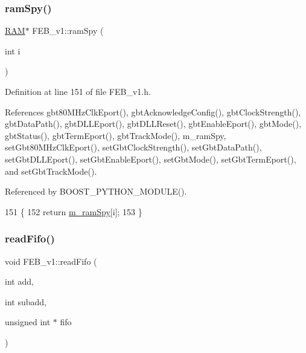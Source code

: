 \subsubsection{\texorpdfstring{ram\+Spy()}{ramSpy()}}
{\footnotesize\ttfamily \hyperlink{classRAM}{R\+AM}$\ast$ F\+E\+B\+\_\+v1\+::ram\+Spy (\begin{DoxyParamCaption}\item[{int}]{i }\end{DoxyParamCaption})\hspace{0.3cm}{\ttfamily [inline]}}



Definition at line 151 of file F\+E\+B\+\_\+v1.\+h.



References gbt80\+M\+Hz\+Clk\+Eport(), gbt\+Acknowledge\+Config(), gbt\+Clock\+Strength(), gbt\+Data\+Path(), gbt\+D\+L\+L\+Eport(), gbt\+D\+L\+L\+Reset(), gbt\+Enable\+Eport(), gbt\+Mode(), gbt\+Status(), gbt\+Term\+Eport(), gbt\+Track\+Mode(), m\+\_\+ram\+Spy, set\+Gbt80\+M\+Hz\+Clk\+Eport(), set\+Gbt\+Clock\+Strength(), set\+Gbt\+Data\+Path(), set\+Gbt\+D\+L\+L\+Eport(), set\+Gbt\+Enable\+Eport(), set\+Gbt\+Mode(), set\+Gbt\+Term\+Eport(), and set\+Gbt\+Track\+Mode().



Referenced by B\+O\+O\+S\+T\+\_\+\+P\+Y\+T\+H\+O\+N\+\_\+\+M\+O\+D\+U\+L\+E().


\begin{DoxyCode}
151                      \{
152     \textcolor{keywordflow}{return} \hyperlink{classFEB__v1_ae6d8176c12bd60ad25ed81d535eb8c82}{m\_ramSpy}[i];
153   \}
\end{DoxyCode}
\mbox{\label{classFEB__v1_af945f99a912c5ad076ebdb03dbb6c139}} 
\subsubsection{\texorpdfstring{read\+Fifo()}{readFifo()}}
{\footnotesize\ttfamily void F\+E\+B\+\_\+v1\+::read\+Fifo (\begin{DoxyParamCaption}\item[{int}]{add,  }\item[{int}]{subadd,  }\item[{unsigned int $\ast$}]{fifo }\end{DoxyParamCaption})}



